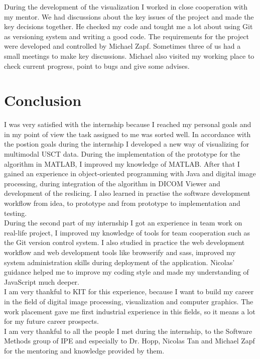 \documentclass[english]{article}
\begin{document}
During the development of the visualization I worked in close cooperation with my mentor. We had discussions about the key issues of the project and made the key decisions together. He checked my code and tought me a lot about using Git as versioning system and writing a good code. The requirements for the project were developed and controlled by Michael Zapf. Sometimes three of us had a small meetings to make key discussions. Michael also visited my working place to check current progress, point to bugs and give some advises.

\section{Conclusion}

I was very satisfied with the internship because I reached my personal goals and in my point of view the task assigned to me was sorted well. In accordance with the postion goals during the internship I developed a new way of visualizing for multimodal USCT data. During the implementation of the prototype for the algorithm in MATLAB, I improved my knowledge of MATLAB. After that I gained an experience in object-oriented programming with Java and digital image processing, during integration of the algorithm in DICOM Viewer and development of the reslicing. I also learned in practise the software development workflow from idea, to prototype and from prototype to implementation and testing.\\

During the second part of my internship I got an experience in team work on real-life project, I improved my knowledge of tools for team cooperation such as the Git version control system. I also studied in practice the web development workflow and web development tools like browserify and sass, improved my system administration skills during deployment of the application. Nicolas' guidance helped me to improve my coding style and made my understanding of JavaScript much deeper.\\

I am very thankful to KIT for this experience, because I want to build my career in the field of digital image processing, visualization and computer graphics. The work placement gave me first industrial experience in this fields, so it means a lot for my future career prospects.\\

I am very thankful to all the people I met during the internship, to the Software Methods group of IPE and especially to Dr. Hopp, Nicolas Tan and Michael Zapf for the mentoring and knowledge provided by them.
\end{document}
